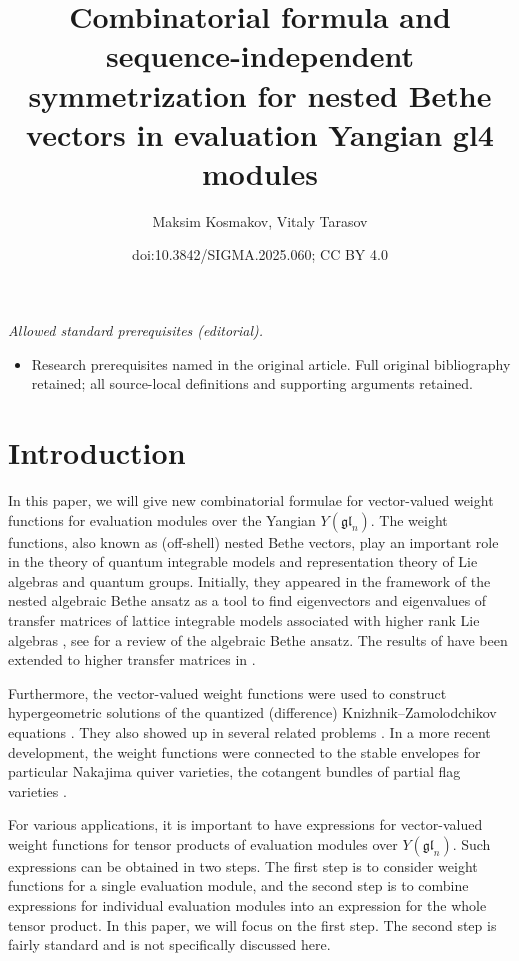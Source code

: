 \documentclass[10pt,a4paper]{amsart}
\title{Combinatorial formula and sequence-independent symmetrization for nested Bethe vectors in evaluation Yangian gl4 modules}
\author{Maksim Kosmakov, Vitaly Tarasov}
\date{doi:10.3842/SIGMA.2025.060; CC BY 4.0}
\numberwithin{equation}{section}
\begin{document}
\maketitle
\noindent\textit{Allowed standard prerequisites (editorial).}\begin{itemize}
\item Research prerequisites named in the original article. Full original bibliography retained; all source-local definitions and supporting arguments retained.
\end{itemize}\medskip
\section{Introduction}%
In this paper, we will give new combinatorial formulae for vector-valued weight functions for
evaluation modules over the Yangian $Y(\mathfrak{gl}_n)$. The weight functions, also known as
(off-shell) nested Bethe vectors, play an important role in the theory of quantum integrable
models and representation theory of Lie algebras and quantum groups. Initially, they appeared
in the framework of the nested algebraic Bethe ansatz as a tool to find eigenvectors and
eigenvalues of transfer matrices of lattice integrable models associated with higher rank Lie
algebras \cite{KulRes83, KulRes82}, see \cite{S1, S2} for a review of the algebraic Bethe ansatz.
The results of \cite{KulRes83} have been extended to higher transfer matrices in \cite{MTV1}.

Furthermore, the vector-valued weight functions were used to construct hypergeometric solutions
of the quantized (difference) Knizhnik--Zamolodchikov equations \cite{MTT, TV}. They also showed
up in several related problems \cite{KPT, MTV2, TV3, TV4}. In a more recent development,
the weight functions were connected to the stable envelopes for particular Nakajima quiver
varieties, the cotangent bundles of partial flag varieties \cite{RTV1, RTV2, RTV3, RTV4, TV5}.

For various applications, it is important to have expressions for vector-valued weight functions
for tensor products of evaluation modules over $Y(\mathfrak{gl}_n)$. Such expressions can be
obtained in two steps. The first step is to consider weight functions for a single evaluation
module, and the second step is to combine expressions for individual evaluation modules
into an expression for the whole tensor product. In this paper, we will focus on the first step.
The second step is fairly standard and is not specifically discussed here.
\end{document}
